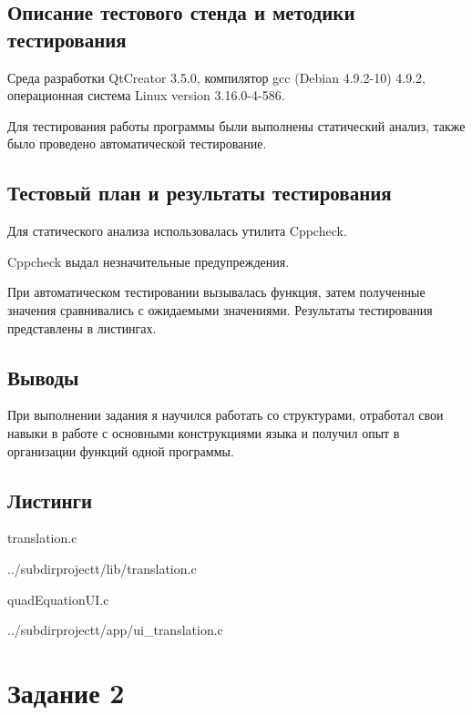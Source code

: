 \documentclass[12pt,a4paper]{report}
\begin{document}
\subsection{Описание тестового стенда и методики тестирования}
Среда разработки QtCreator 3.5.0, компилятор gcc (Debian 4.9.2-10) 4.9.2, операционная система Linux version 3.16.0-4-586.

Для тестирования работы программы были выполнены статический анализ, также было проведено автоматической тестирование.

\subsection{Тестовый план и результаты тестирования}
		Для статического анализа использовалась утилита Cppcheck.
		
		\vspace{\baselineskip}
		 Cppcheck выдал незначительные предупреждения.
		
		\vspace{\baselineskip}
		При автоматическом тестировании вызывалась функция, затем полученные значения сравнивались с ожидаемыми значениями. Результаты тестирования представлены в листингах.
		
		\vspace{\baselineskip}
	 

 
\subsection{Выводы}

При выполнении задания я научился работать со структурами, отработал свои навыки в работе с основными конструкциями языка и получил опыт в организации функций одной программы.

\subsection*{Листинги}

translation.c

{../subdirprojectt/lib/translation.c}

\vspace{\baselineskip}

quadEquationUI.c

{../subdirprojectt/app/ui_translation.c}


\section{Задание 2}
\end{document}
